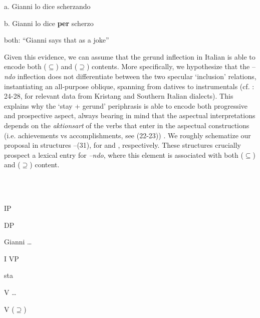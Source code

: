 \documentclass[output=paper]{langsci/langscibook}
\begin{document}
          a.  Gianni lo dice scherzando

b.  Gianni lo dice \textbf{per} scherzo

both: “Gianni says that as a joke”

Given this evidence, we can assume that the gerund inflection in Italian is able to encode both (${\subseteq}$) and (${\supseteq}$) contents. More specifically, we hypothesize that the –\textit{ndo} inflection does not differentiate between the two specular ‘inclusion’ relations, instantiating an all-purpose oblique, spanning from datives to instrumentals (cf. \citealt{FrancoManzini2017}: 24-28, for relevant data from Kristang and Southern Italian dialects). This explains why the ‘stay + gerund’ periphrasis is able to encode both progressive and prospective aspect, always bearing in mind that the aspectual interpretations depends on the \textit{aktionsart} of the verbs that enter in the aspectual constructions (i.e. achievements vs accomplishments, see (22-23)) . We roughly schematize our proposal in structures –(31), for  and , respectively. These structures crucially prospect a lexical entry for \textit{–ndo}, where this element is associated with both (${\subseteq}$) and (${\supseteq}$) content.

\ea%
    \label{ex:key:30}
    \gll\\
        \\
    \glt
    \z

                                                IP

                               

                            DP 

                          Gianni                                    …

                                             I                          VP

                                           sta

                                                          V                         …

                                                   

                                              V                      (${\supseteq}$)
\end{document}
